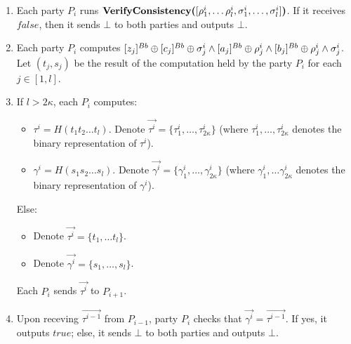 \begin{protocol}
\begin{enumerate}
        \item Each party $P_i$ runs $\textbf{VerifyConsistency(}[\rho^i_1, \ldots \rho^i_l, \sigma^i_1, \ldots, \sigma^i_l]\textbf{)}$.
        If it receives $false$, then it sends $\bot$ to both parties and outputs $\bot$.
        \item Each party $P_i$ computes $[z_j]^{Bb} \oplus [c_j]^{Bb} \oplus \sigma^i_j \wedge [a_j]^{Bb} \oplus \rho^i_j \wedge [b_j]^{Bb} \oplus \rho^i_j \wedge \sigma^i_j$. Let $(t_j, s_j)$ be the result of the computation held by the party $P_i$ for each $j \in [1, l]$.
        \item If $l > 2\kappa$, each $P_i$ computes:
        \begin{itemize}
            \item $\tau^i = H(t_1 t_2 \ldots t_l)$.
            Denote $\vec{\tau^i} = \{\tau^i_1, \ldots, \tau^i_{2\kappa}\}$ (where $\tau^i_1, \ldots, \tau^i_{2\kappa}$ denotes the binary representation of $\tau^i$).
            \item $\gamma^i = H(s_1 s_2 \ldots s_l)$. 
            Denote $\vec{\gamma^i} = \{\gamma^i_1, \ldots, \gamma^i_{2\kappa}\}$ (where $\gamma^i_1, \ldots \gamma^i_{2\kappa}$ denotes the binary representation of $\gamma^i$).
        \end{itemize}
        Else:
        \begin{itemize}
            \item Denote $\vec{\tau^i} = \{t_1, \ldots t_l\}$.
            \item Denote $\vec{\gamma^i} = \{s_1, \ldots, s_l\}$.
        \end{itemize}
        Each $P_i$ sends $\vec{\tau^i}$ to $P_{i + 1}$. 
        \item Upon receving $\vec{\tau^{i - 1}}$ from $P_{i - 1}$, party $P_i$ 
        checks that $\vec{\gamma^i} = \vec{\tau^{i - 1}}$. If yes, it outputs $true$; else, it sends $\bot$ to both parties and outputs $\bot$.
    \end{enumerate}
\end{protocol}
